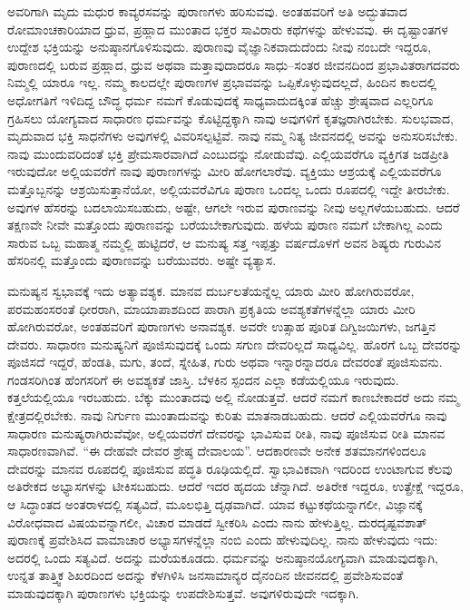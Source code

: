 \vskip 5pt

ಅವರಿಗಾಗಿ ಮೃದು ಮಧುರ ಕಾವ್ಯರಸವನ್ನು ಪುರಾಣಗಳು ಹರಿಸುವವು. ಅಂತಹವರಿಗೆ ಅತಿ ಅದ್ಭುತವಾದ ರೋಮಾಂಚಕಾರಿಯಾದ ಧ್ರುವ, ಪ್ರಹ್ಲಾದ ಮುಂತಾದ ಭಕ್ತರ ಸಾವಿರಾರು ಕಥೆಗಳನ್ನು ಹೇಳುವವು. ಈ ದೃಷ್ಟಾಂತಗಳ ಉದ್ದೇಶ ಭಕ್ತಿಯನ್ನು ಅನುಷ್ಠಾನಗೊಳಿಸುವುದು. ಪುರಾಣವು ವೈಜ್ಞಾನಿಕವಾದುದೆಂದು ನೀವು ನಂಬದೇ ಇದ್ದರೂ, ಪುರಾಣದಲ್ಲಿ ಬರುವ ಪ್ರಹ್ಲಾದ, ಧ್ರುವ ಅಥವಾ ಮತ್ತಾವುದಾದರೂ ಸಾಧು–ಸಂತರ ಜೀವನದಿಂದ ಪ್ರಭಾವಿತರಾಗದವರು ನಿಮ್ಮಲ್ಲಿ ಯಾರೂ ಇಲ್ಲ. ನಮ್ಮ ಕಾಲದಲ್ಲೇ ಪುರಾಣಗಳ ಪ್ರಭಾವವನ್ನು ಒಪ್ಪಿಕೊಳ್ಳುವುದಲ್ಲದೆ, ಹಿಂದಿನ ಕಾಲದಲ್ಲಿ ಅಧೋಗತಿಗೆ ಇಳಿದಿದ್ದ ಬೌದ್ಧ ಧರ್ಮ ನಮಗೆ ಕೊಡುವುದಕ್ಕೆ ಸಾಧ್ಯವಾದುದಕ್ಕಿಂತ ಹೆಚ್ಚು ಶ್ರೇಷ್ಠವಾದ ಎಲ್ಲರಿಗೂ ಗ್ರಹಿಸಲು ಯೋಗ್ಯವಾದ ಸಾಧಾರಣ ಧರ್ಮವನ್ನು ಕೊಟ್ಟಿದ್ದಕ್ಕಾಗಿ ನಾವು ಅವುಗಳಿಗೆ ಕೃತಜ್ಞರಾಗಿರಬೇಕು. ಸುಲಭವಾದ, ಮೃದುವಾದ ಭಕ್ತಿ ಸಾಧನೆಗಳು ಅವುಗಳಲ್ಲಿ ವಿವರಿಸಲ್ಪಟ್ಟಿವೆ. ನಾವು ನಮ್ಮ ನಿತ್ಯ ಜೀವನದಲ್ಲಿ ಅವನ್ನು ಅನುಸರಿಸಬೇಕು. ನಾವು ಮುಂದುವರಿದಂತೆ ಭಕ್ತಿ ಪ್ರೇಮಸಾರವಾಗಿದೆ ಎಂಬುದನ್ನು ನೋಡುವೆವು. ಎಲ್ಲಿಯವರೆಗೂ ವ್ಯಕ್ತಿಗತ ಜಡಪ್ರೀತಿ ಇರುವುದೋ ಅಲ್ಲಿಯವರೆಗೆ ನಾವು ಪುರಾಣಗಳನ್ನು ಮೀರಿ ಹೋಗಲಾರೆವು. ವ್ಯಕ್ತಿಯು ಆಶ್ರಯಕ್ಕೆ ಎಲ್ಲಿಯವರೆಗೂ ಮತ್ತೊಬ್ಬನನ್ನು ಆಶ್ರಯಿಸುತ್ತಾನೆಯೋ, ಅಲ್ಲಿಯವರೆವಿಗೂ ಪುರಾಣ ಒಂದಲ್ಲ ಒಂದು ರೂಪದಲ್ಲಿ ಇದ್ದೇ ತೀರಬೇಕು. ಅವುಗಳ ಹೆಸರನ್ನು ಬದಲಾಯಿಸಬಹುದು, ಅಷ್ಟೇ, ಆಗಲೇ ಇರುವ ಪುರಾಣವನ್ನು ನೀವು ಅಲ್ಲಗಳೆಯಬಹುದು. ಆದರೆ ತಕ್ಷಣವೇ ನೀವೇ ಮತ್ತೊಂದು ಪುರಾಣವನ್ನು ಬರೆಯಬೇಕಾಗುವುದು. ಹಳೆಯ ಪುರಾಣ ನಮಗೆ ಬೇಕಾಗಿಲ್ಲ ಎಂದು ಸಾರುವ ಒಬ್ಬ ಮಹಾತ್ಮ ನಮ್ಮಲ್ಲಿ ಹುಟ್ಟಿದರೆ, ಆ ಮನುಷ್ಯ ಸತ್ತ ಇಪ್ಪತ್ತು ವರ್ಷದೊಳಗೆ ಅವನ ಶಿಷ್ಯರು ಗುರುವಿನ ಹೆಸರಿನಲ್ಲಿ ಮತ್ತೊಂದು ಪುರಾಣವನ್ನು ಬರೆಯುವರು. ಅಷ್ಟೇ ವ್ಯತ್ಯಾಸ.

ಮನುಷ್ಯನ ಸ್ವಭಾವಕ್ಕೆ ಇದು ಅತ್ಯಾವಶ್ಯಕ. ಮಾನವ ದುರ್ಬಲತೆಯನ್ನೆಲ್ಲ ಯಾರು ಮೀರಿ ಹೋಗಿರುವರೋ, ಪರಮಹಂಸರಂತೆ ಧೀರರಾಗಿ, ಮಾಯಾಪಾಶದಿಂದ ಪಾರಾಗಿ ಪ್ರಕೃತಿಯ ಅವಶ್ಯಕತೆಗಳನ್ನೆಲ್ಲಾ ಯಾರು ಮೀರಿ ಹೋಗಿರುವರೋ, ಅಂತಹವರಿಗೆ ಪುರಾಣಗಳು ಅನಾವಶ್ಯಕ. ಅವರೇ ಉತ್ಸಾಹ ಪೂರಿತ ದಿಗ್ವಿಜಯಿಗಳು, ಜಗತ್ತಿನ ದೇವರು. ಸಾಧಾರಣ ಮನುಷ್ಯನಿಗೆ ಪೂಜಿಸುವುದಕ್ಕೆ ಒಂದು ಸಗುಣ ದೇವರಿಲ್ಲದೆ ಸಾಧ್ಯವಿಲ್ಲ. ಹೊರಗೆ ಒಬ್ಬ ದೇವರನ್ನು ಪೂಜಿಸದೆ ಇದ್ದರೆ, ಹೆಂಡತಿ, ಮಗು, ತಂದೆ, ಸ್ನೇಹಿತ, ಗುರು ಅಥವಾ ಇನ್ನಾರನ್ನಾದರೂ ದೇವರಂತೆ ಪೂಜಿಸುವನು. ಗಂಡಸರಿಗಿಂತ ಹೆಂಗಸರಿಗೆ ಈ ಅವಶ್ಯಕತೆ ಜಾಸ್ತಿ. ಬೆಳಕಿನ ಸ್ಪಂದನ ಎಲ್ಲಾ ಕಡೆಯಲ್ಲಿಯೂ ಇರುವುದು. ಕತ್ತಲೆಯಲ್ಲಿಯೂ ಇರಬಹುದು. ಬೆಕ್ಕು ಮುಂತಾದವು ಅಲ್ಲಿ ನೋಡುತ್ತವೆ. ಆದರೆ ನಮಗೆ ಕಾಣಬೇಕಾದರೆ ಅದು ನಮ್ಮ ಕ್ಷೇತ್ರದಲ್ಲಿರಬೇಕು. ನಾವು ನಿರ್ಗುಣ ಮುಂತಾದುವನ್ನು ಕುರಿತು ಮಾತನಾಡಬಹುದು. ಆದರೆ ಎಲ್ಲಿಯವರೆಗೂ ನಾವು ಸಾಧಾರಣ ಮನುಷ್ಯರಾಗಿರುವೆವೋ, ಅಲ್ಲಿಯವರೆಗೆ ದೇವರನ್ನು ಭಾವಿಸುವ ರೀತಿ, ನಾವು ಪೂಜಿಸುವ ರೀತಿ ಮಾನವ ಸಾಧಾರಣವಾಗಿವೆ. “ಈ ದೇಹವೇ ದೇವರ ಶ್ರೇಷ್ಠ ದೇವಾಲಯ”. ಆದಕಾರಣವೇ ಅನೇಕ ಶತಮಾನಗಳಿಂದಲೂ ದೇವರನ್ನು ಮಾನವ ರೂಪದಲ್ಲಿ ಪೂಜಿಸುವ ಪದ್ಧತಿ ರೂಢಿಯಲ್ಲಿದೆ. ಸ್ವಾಭಾವಿಕವಾಗಿ ಇದರಿಂದ ಉಂಟಾಗುವ ಕೆಲವು ಅತಿರೇಕದ ಅಭ್ಯಾಸಗಳನ್ನು ಟೀಕಿಸಬಹುದು. ಆದರೆ ಇದರ ಹೃದಯ ಚೆನ್ನಾಗಿದೆ. ಅತಿರೇಕ ಇದ್ದರೂ, ಉತ್ಪ್ರೇಕ್ಷೆ ಇದ್ದರೂ, ಆ ಸಿದ್ಧಾಂತದ ಅಂತರಾಳದಲ್ಲಿ ಸತ್ಯವಿದೆ, ಮೂಲಭಿತ್ತಿ ದೃಢವಾಗಿದೆ. ಯಾವ ಕಟ್ಟುಕಥೆಯನ್ನಾಗಲೀ, ವಿಜ್ಞಾನಕ್ಕೆ ವಿರೋಧವಾದ ವಿಷಯವನ್ನಾಗಲೀ, ವಿಚಾರ ಮಾಡದೆ ಸ್ವೀಕರಿಸಿ ಎಂದು ನಾನು ಹೇಳುತ್ತಿಲ್ಲ. ದುರದೃಷ್ಟವಶಾತ್​ ಪುರಾಣಕ್ಕೆ ಪ್ರವೇಶಿಸಿದ ವಾಮಾಚಾರ ಅಭ್ಯಾಸಗಳನ್ನೆಲ್ಲಾ ನಂಬಿ ಎಂದು ಹೇಳುವುದಿಲ್ಲ. ನಾನು ಹೇಳುವುದು ಇದು: ಅದರಲ್ಲಿ ಒಂದು ಸತ್ಯವಿದೆ. ಅದನ್ನು ಮರೆಯಕೂಡದು. ಧರ್ಮವನ್ನು ಅನುಷ್ಠಾನಯೋಗ್ಯವಾಗಿ ಮಾಡುವುದಕ್ಕಾಗಿ, ಉನ್ನತ ತಾತ್ತ್ವಿಕ ಶಿಖರದಿಂದ ಅದನ್ನು ಕೆಳಗಿಳಿಸಿ ಜನಸಾಮಾನ್ಯರ ದೈನಂದಿನ ಜೀವನದಲ್ಲಿ ಪ್ರವೇಶಿಸುವಂತೆ ಮಾಡುವುದಕ್ಕಾಗಿ ಪುರಾಣಗಳು ಭಕ್ತಿಯನ್ನು ಉಪದೇಶಿಸುತ್ತವೆ. ಅವುಗಳಿರುವುದೇ ಇದಕ್ಕಾಗಿ.

